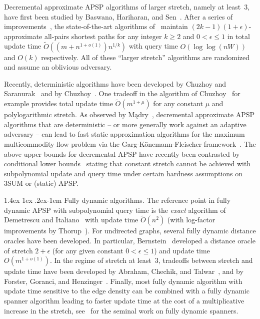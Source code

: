 \documentclass[11pt]{article}
\makeatletter
\theoremstyle{definition}
\theoremstyle{remark}
\renewcommand{\paragraph}{%
  \@startsection{paragraph}{4}%
  {\z@}{1.4ex \@plus 1ex \@minus .2ex}{-1em}%
  {\normalfont\normalsize\bfseries}%
}
\makeatother
\begin{document}
Decremental approximate APSP algorithms of larger stretch, namely at least~$ 3 $, have first been studied by Baswana, Hariharan, and Sen~\cite{BaswanaHS03}.
After a series of improvements~\cite{RZ12, BR11, AbrahamCT14, henzinger2014decremental}, the state-of-the-art algorithms of~\cite{Chechik18,LN2020} maintain $ (2k-1)(1 + \epsilon) $-approximate all-pairs shortest paths for any integer $ k \geq 2 $ and $ 0 < \epsilon \leq 1 $ in total update time $ \tilde O ( (m+n^{1+o(1)})n^{1/k}) $ with query time  $O(\log \log (nW))$ and $O(k)$ respectively.
All of these ``larger stretch'' algorithms are randomized and assume an oblivious adversary.

Recently, deterministic algorithms have been developed by Chuzhoy and Saranurak~\cite{ChuzhoyS21} and by Chuzhoy~\cite{Chuzhoy21}.
One tradeoff in the algorithm of Chuzhoy~\cite{Chuzhoy21} for example provides total update time $ \tilde O (m^{1 + \mu}) $ for any constant $ \mu $ and polylogarithmic stretch.
As observed by Mądry~\cite{Madry10}, decremental approximate APSP algorithms that are deterministic -- or more generally work against an adaptive adversary -- can lead to fast static approximation algorithms for the maximum multicommodity flow problem via the Garg-Könemann-Fleischer framework~\cite{GargK07,Fleischer00}.
The above upper bounds for decremental APSP have recently been contrasted by conditional lower bounds~\cite{AbboudBKZ22} stating that constant stretch cannot be achieved with subpolynomial update and query time under certain hardness assumptions on 3SUM or (static) APSP.


\paragraph{Fully dynamic algorithms.}
The reference point in fully dynamic APSP with subpolynomial query time is the \emph{exact} algorithm of Demetrescu and Italiano~\cite{DemetrescuI04} with update time $ \tilde O (n^2) $ (with log-factor improvements by Thorup~\cite{Thorup04}).
For undirected graphs, several fully dynamic distance oracles have been developed.
In particular, Bernstein~\cite{Bernstein09} developed a distance oracle of stretch $ 2 + \epsilon $ (for any given constant $ 0 < \epsilon \leq 1 $) and update time $ O (m^{1 + o(1)}) $.
In the regime of stretch at least~$ 3 $, tradeoffs between stretch and update time have been developed by Abraham, Chechik, and Talwar~\cite{AbrahamCT14}, and by Forster, Goranci, and Henzinger~\cite{ForsterGH21}.
Finally, most fully dynamic algorithm with update time sensitive to the edge density can be combined with a fully dynamic spanner algorithm leading to faster update time at the cost of a multiplicative increase in the stretch, see~\cite{BaswanaKS12} for the seminal work on fully dynamic spanners.
\end{document}
